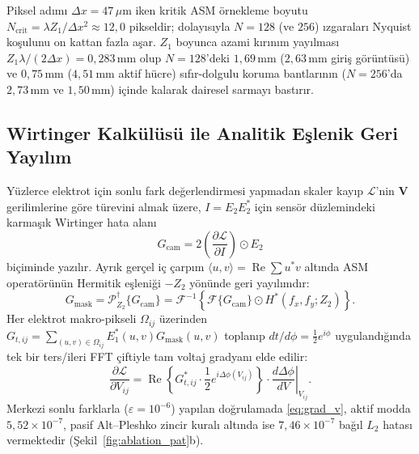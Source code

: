 \documentclass[journal]{IEEEtran}
\begin{document}
Piksel ad\i{}m\i{} $\Delta x = 47\,\mu\text{m}$ iken kritik ASM \"ornekleme boyutu $N_{\mathrm{crit}} = \lambda Z_1 / \Delta x^2 \approx 12{,}0$ pikseldir; dolay\i{}s\i{}yla $N=128$ (ve $256$) \i{}zgaralar\i{} Nyquist ko\c{s}ulunu on kattan fazla a\c{s}ar. $Z_1$ boyunca azami k\i{}r\i{}n\i{}m yay\i{}lmas\i{} $Z_1\lambda/(2\Delta x) = 0{,}283\,\text{mm}$ olup $N=128$'deki $1{,}69\,\text{mm}$ ($2{,}63\,\text{mm}$ giri\c{s} g\"or\"unt\"us\"u) ve $0{,}75\,\text{mm}$ ($4{,}51\,\text{mm}$ aktif h\"ucre) s\i{}f\i{}r-dolgulu koruma bantlar\i{}n\i{}n ($N=256$'da $2{,}73\,\text{mm}$ ve $1{,}50\,\text{mm}$) i\c{c}inde kalarak dairesel sarmay\i{} bast\i{}r\i{}r.

\subsection{Wirtinger Kalk\"ul\"us\"u ile Analitik E\c{s}lenik Geri Yay\i{}l\i{}m}
Y\"uzlerce elektrot i\c{c}in sonlu fark de\u{g}erlendirmesi yapmadan skaler kay\i{}p $\mathcal{L}$'nin $\mathbf{V}$ gerilimlerine g\"ore t\"urevini almak \"uzere, $I = E_2 E_2^*$ i\c{c}in sens\"or d\"uzlemindeki karma\c{s}\i{}k Wirtinger hata alan\i{}
\begin{equation}
  G_{\mathrm{cam}} = 2 \left(\frac{\partial \mathcal{L}}{\partial I}\right) \odot E_2
  \label{eq:wirtinger}
\end{equation}
bi\c{c}iminde yaz\i{}l\i{}r. Ayr\i{}k ger\c{c}el i\c{c} \c{c}arp\i{}m $\langle u, v \rangle = \operatorname{Re}\sum u^* v$ alt\i{}nda ASM operat\"or\"un\"un Hermitik e\c{s}leni\u{g}i $-Z_2$ y\"on\"unde geri yay\i{}l\i{}md\i{}r:
\begin{equation}
  G_{\mathrm{mask}} = \mathcal{P}_{Z_2}^{\dagger}\{G_{\mathrm{cam}}\} = \mathcal{F}^{-1}\!\left\{\mathcal{F}\{G_{\mathrm{cam}}\} \odot H^*(f_x, f_y; Z_2)\right\}.
  \label{eq:adjoint}
\end{equation}
Her elektrot makro-pikseli $\Omega_{ij}$ \"uzerinden $G_{t,ij} = \sum_{(u,v)\in\Omega_{ij}} E_1^*(u,v) G_{\mathrm{mask}}(u,v)$ toplan\i{}p $dt/d\phi = \frac{1}{2}e^{i\phi}$ uyguland\i{}\u{g}\i{}nda tek bir ters/ileri FFT \c{c}iftiyle tam voltaj gradyan\i{} elde edilir:
\begin{equation}
  \frac{\partial \mathcal{L}}{\partial V_{ij}} = \operatorname{Re}\!\left\{G_{t,ij}^* \cdot \frac{1}{2}e^{i\Delta\phi(V_{ij})}\right\} \cdot \left.\frac{d\Delta\phi}{dV}\right|_{V_{ij}}.
  \label{eq:grad_v}
\end{equation}
Merkezi sonlu farklarla ($\varepsilon = 10^{-6}$) yap\i{}lan do\u{g}rulamada \eqref{eq:grad_v}, aktif modda $5{,}52 \times 10^{-7}$, pasif Alt--Pleshko zincir kural\i{} alt\i{}nda ise $7{,}46 \times 10^{-7}$ ba\u{g}\i{}l $L_2$ hatas\i{} vermektedir (\c{S}ekil~\ref{fig:ablation_pat}b).
\end{document}
